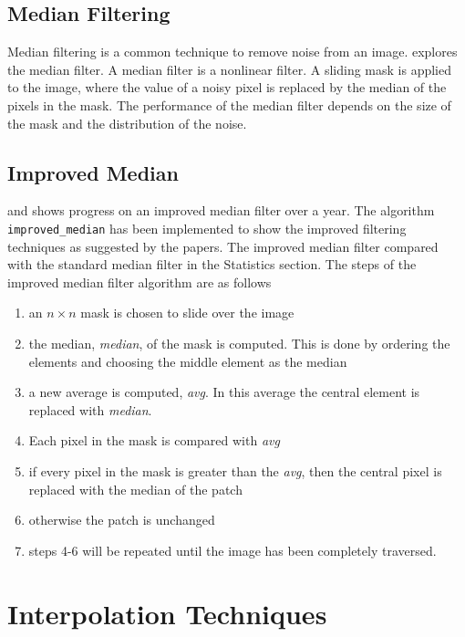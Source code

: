 \documentclass{article}
\begin{document}
\subsection{Median Filtering}
%
Median filtering is a common technique to remove noise from an
image. \cite{Med2012} explores the median filter. A median filter is a
nonlinear filter. A sliding mask is applied to the image, where the
value of a noisy pixel is replaced by the median of the pixels in
the mask. The performance of the median filter depends on the size
of the mask and the distribution of the noise.

\subsection{Improved Median}
\cite{improved-median} and \cite{Med2012} shows progress on an
improved median filter over a year. The algorithm
\texttt{improved\_median} has been implemented to show the improved
filtering techniques as suggested by the papers. The improved
median filter compared with
the standard median filter in the Statistics section. The steps of
the improved median filter algorithm are as
follows
\begin{enumerate}
  \item an $n\times n$ mask is chosen to slide over the image
  \item the median, \textit{median}, of the mask is computed. This
    is done by ordering the elements and choosing the middle
    element as the median
  \item a new average is computed, \textit{avg}. In this average the
    central element is replaced with \textit{median}.
  \item Each pixel in the mask is compared with
    \textit{avg}
  \item if every pixel in the mask is greater than the
    \textit{avg}, then the central pixel is replaced with the
    median of the patch
  \item otherwise the patch is unchanged
  \item steps 4-6 will be repeated until the image has been
    completely traversed.
\end{enumerate}
%
\section{Interpolation Techniques}

% 
\end{document}
